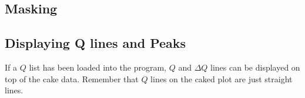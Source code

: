 \subsection{Masking}

\subsection{Displaying Q lines and Peaks}
If a $Q$ list has been loaded into the program, 
$Q$ and $\Delta Q$ lines can be displayed on top
of the cake data. Remember that $Q$ lines on the
caked plot are just straight lines. 



\begin{figure}
    \centering

\end{figure}

